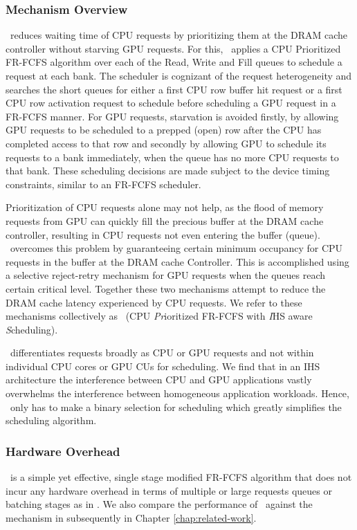 \subsubsection{Mechanism Overview}
\par \cachename\ reduces waiting time of CPU requests by prioritizing them at the DRAM cache controller without starving GPU requests. 
For this, \cachename\ applies a CPU Prioritized FR-FCFS algorithm over each of the Read, Write and Fill queues to schedule a request at each bank. 
The scheduler is cognizant of the request heterogeneity and searches the short queues for either a first CPU row buffer hit request or a first CPU row activation request to schedule before scheduling a GPU request in a FR-FCFS manner. For GPU requests, starvation is avoided firstly, by allowing GPU requests to be scheduled to a prepped (open) row after the CPU has completed access to that row and secondly by allowing GPU to schedule its requests to a bank immediately, when the queue has no more CPU requests to that bank. These scheduling decisions are made subject to the device timing constraints, similar to an FR-FCFS scheduler.
\par Prioritization of CPU requests alone may not help, as the flood of memory requests from  GPU can quickly fill the precious buffer at the DRAM cache controller, resulting in CPU requests not even entering the buffer (queue). \cachename\ overcomes this problem by guaranteeing certain minimum occupancy for CPU requests in the buffer at the DRAM cache Controller. This is accomplished using a selective reject-retry mechanism for GPU requests when the queues reach certain critical level.  Together these two mechanisms attempt to reduce the DRAM cache latency experienced by CPU requests.  We refer to these  mechanisms collectively as \prioname\ (CPU \emph{Pr}ioritized FR-FCFS with \emph{I}HS aware \emph{S}cheduling). 
\par \prioname\ differentiates requests broadly as CPU or GPU requests and not within individual CPU cores or GPU CUs for scheduling. We find that in an IHS architecture the interference between CPU and GPU applications vastly overwhelms the interference between homogeneous application workloads. Hence, \prioname\ only has to make a binary selection for scheduling which greatly simplifies the scheduling algorithm. 

\subsubsection{Hardware Overhead}
\prioname\ is a simple yet effective, single stage modified FR-FCFS algorithm that does not incur any hardware overhead in terms of multiple or large requests queues or batching stages as in \cite{sms}. We also compare the performance of \prioname\ against the mechanism in \cite{sms} subsequently in Chapter \ref{chap:related-work}.

